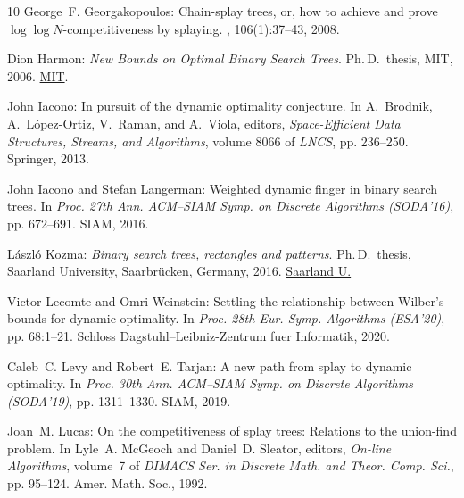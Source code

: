 \documentclass[11pt]{article}
\numberwithin{equation}{section}
\theoremstyle{definition}
\theoremstyle{plain}
\begin{document}
\begin{thebibliography}{10}
{\sc George~F. Georgakopoulos}: Chain-splay trees, or, how to achieve and prove
  {$\log\log N$}-competitiveness by splaying.
, 106(1):37--43, 2008.

{\sc Dion Harmon}: {\em New Bounds on Optimal Binary Search Trees}.
\newblock Ph.\,D.\ thesis, MIT, 2006.
\newblock
  \href{https://dspace.mit.edu/bitstream/handle/1721.1/34268/71014527-MIT.pdf}{MIT}.

{\sc John Iacono}: In pursuit of the dynamic optimality conjecture.
\newblock In {\sc A.~Brodnik, A.~López-Ortiz, V.~Raman, and A.~Viola},
  editors, {\em Space-Efficient Data Structures, Streams, and Algorithms},
  volume 8066 of {\em LNCS}, pp. 236--250. Springer, 2013.
\newblock [\epfmtdoi{10.1007/978-3-642-40273-9\_16}]

{\sc John Iacono and Stefan Langerman}: Weighted dynamic finger in binary
  search trees.
\newblock In {\em Proc. 27th Ann. ACM--SIAM Symp. on Discrete Algorithms
  (SODA'16)}, pp. 672--691. SIAM, 2016.
\newblock [\epfmtdoi{10.1137/1.9781611974331.ch49}]

{\sc L\'aszl\'o Kozma}: {\em Binary search trees, rectangles and patterns}.
\newblock Ph.\,D.\ thesis, Saarland University, Saarbr{\"{u}}cken, Germany,
  2016.
\newblock
  \href{http://scidok.sulb.uni-saarland.de/volltexte/2016/6646/}{Saarland U.}

{\sc Victor Lecomte and Omri Weinstein}: Settling the relationship between
  {W}ilber’s bounds for dynamic optimality.
\newblock In {\em Proc. 28th Eur. Symp. Algorithms (ESA'20)}, pp. 68:1--21.
  Schloss Dagstuhl--Leibniz-Zentrum fuer Informatik, 2020.

{\sc Caleb~C. Levy and Robert~E. Tarjan}: A new path from splay to dynamic
  optimality.
\newblock In {\em Proc. 30th Ann. ACM--SIAM Symp. on Discrete Algorithms
  (SODA'19)}, pp. 1311--1330. SIAM, 2019.
\newblock [\epfmtdoi{10.1137/1.9781611975482.80}]

{\sc Joan~M. Lucas}: On the competitiveness of splay trees: {R}elations to the
  union-find problem.
\newblock In {\sc Lyle~A. McGeoch and Daniel~D. Sleator}, editors, {\em On-line
  Algorithms}, volume~7 of {\em DIMACS Ser. in Discrete Math. and Theor. Comp.
  Sci.}, pp. 95--124. Amer. Math. Soc., 1992.


\end{thebibliography}
\end{document}
